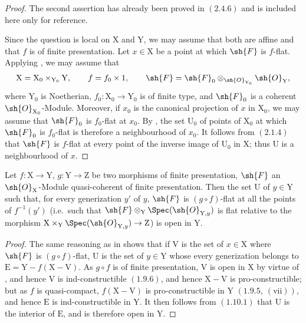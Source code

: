 \begin{proof}
The second assertion has already been proved in $(2.4.6)$ and is
included here only for reference.

Since the question is local on $\mathrm{X}$ and $\mathrm{Y}$, we may
assume that both are affine and that $f$ is of finite presentation. Let
$x\in\mathrm{X}$ be a point at which $\sh{F}$ is $f$-flat. Applying
, we may assume that
\[
  \mathrm{X}=\mathrm{X}_0\times_{\mathrm{Y}_0}\mathrm{Y},
  \qquad
  f=f_0\times 1,
  \qquad
  \sh{F}
  =\sh{F}_0\otimes_{\sh{O}_{\mathrm{Y}_0}}\sh{O}_\mathrm{Y},
\]
where $\mathrm{Y}_0$ is Noetherian,
$f_0:\mathrm{X}_0\to\mathrm{Y}_0$ is of finite type, and
$\sh{F}_0$ is a coherent $\sh{O}_{\mathrm{X}_0}$-Module. Moreover, if
$x_0$ is the canonical projection of $x$ in $\mathrm{X}_0$, we may
assume that $\sh{F}_0$ is $f_0$-flat at $x_0$. By
, the set $\mathrm{U}_0$ of points of
$\mathrm{X}_0$ at which $\sh{F}_0$ is $f_0$-flat is therefore a
neighbourhood of $x_0$. It follows from $(2.1.4)$ that $\sh{F}$ is
$f$-flat at every point of the inverse image of $\mathrm{U}_0$ in
$\mathrm{X}$; thus $\mathrm{U}$ is a neighbourhood of $x$.
\end{proof}


\begin{corollary}[11.3.2]
\label{IV.11.3.2}
Let $f:\mathrm{X}\to\mathrm{Y}$, $g:\mathrm{Y}\to\mathrm{Z}$ be two morphisms of finite presentation, $\sh{F}$ an $\sh{O}_\mathrm{X}$-Module quasi-coherent of finite presentation. Then the set $\mathrm{U}$ of $y\in\mathrm{Y}$ such that, for every generization $y'$ of $y$, $\sh{F}$ is $(g\circ f)$-flat at all the points of $f^{-1}(y')$ (i.e.\ such that $\sh{F}\otimes_\mathrm{Y}\Spec(\sh{O}_{\mathrm{Y},y})$ is flat relative to the morphism $\mathrm{X}\times_\mathrm{Y}\Spec(\sh{O}_{\mathrm{Y},y})\to\mathrm{Z}$) is open in $\mathrm{Y}$.
\end{corollary}

\begin{proof}
The same reasoning as in  shows that if $\mathrm{V}$ is the set of $x\in\mathrm{X}$ where $\sh{F}$ is $(g\circ f)$-flat, $\mathrm{U}$ is the set of $y\in\mathrm{Y}$ whose every generization belongs to $\mathrm{E}=\mathrm{Y}-f(\mathrm{X}-\mathrm{V})$. As $g\circ f$ is of finite presentation, $\mathrm{V}$ is open in $\mathrm{X}$ by virtue of , and hence $\mathrm{V}$ is ind-constructible $(1.9.6)$, and hence $\mathrm{X}-\mathrm{V}$ is pro-constructible; but as $f$ is quasi-compact, $f(\mathrm{X}-\mathrm{V})$ is pro-constructible in $\mathrm{Y}$ $(1.9.5,~(\mathrm{vii}))$, and hence $\mathrm{E}$ is ind-constructible in $\mathrm{Y}$. It then follows from $(1.10.1)$ that $\mathrm{U}$ is the interior of $\mathrm{E}$, and is therefore open in $\mathrm{Y}$.
\end{proof}


